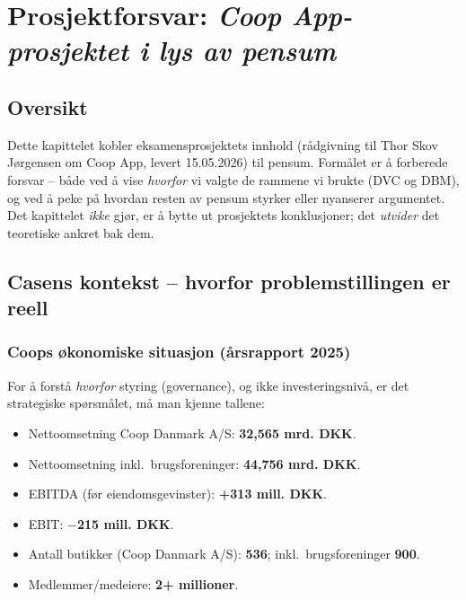 \section{Prosjektforsvar: \emph{Coop App-prosjektet i lys av pensum}}
\label{sec:project_defense}

\subsection*{Oversikt}
Dette kapittelet kobler eksamensprosjektets innhold (rådgivning til Thor
Skov Jørgensen om Coop App, levert 15.05.2026) til pensum. Formålet er å
forberede forsvar -- både ved å vise \emph{hvorfor} vi valgte de rammene vi
brukte (DVC og DBM), og ved å peke på hvordan resten av pensum styrker eller
nyanserer argumentet. Det kapittelet \emph{ikke} gjør, er å bytte ut
prosjektets konklusjoner; det \emph{utvider} det teoretiske ankret bak dem.

\subsection{Casens kontekst -- hvorfor problemstillingen er reell}

\subsubsection*{Coops økonomiske situasjon (årsrapport 2025)}
For å forstå \emph{hvorfor} styring (governance), og ikke investeringsnivå,
er det strategiske spørsmålet, må man kjenne tallene:

\begin{itemize}
  \item Nettoomsetning Coop Danmark A/S: \textbf{32{,}565 mrd. DKK}.
  \item Nettoomsetning inkl.\ brugsforeninger: \textbf{44{,}756 mrd. DKK}.
  \item EBITDA (før eiendomsgevinster): \textbf{+313 mill. DKK}.
  \item EBIT: \textbf{$-$215 mill. DKK}.
  \item Antall butikker (Coop Danmark A/S): \textbf{536}; inkl.\ brugsforeninger \textbf{900}.
  \item Medlemmer/medeiere: \textbf{2+ millioner}.
\end{itemize}


